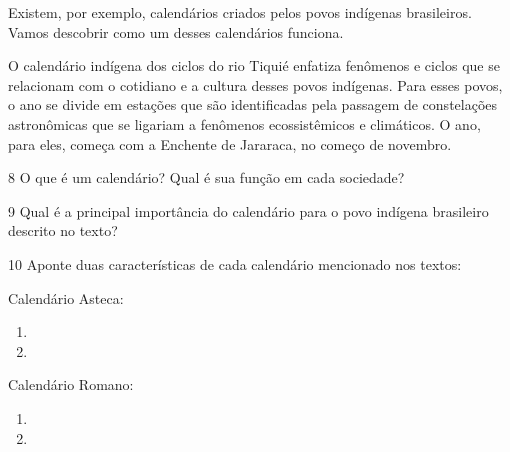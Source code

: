 Existem, por exemplo, calendários criados pelos povos indígenas brasileiros. Vamos descobrir como um desses calendários funciona.

O calendário indígena dos ciclos do rio Tiquié enfatiza fenômenos e ciclos que se relacionam com o cotidiano e a cultura desses povos indígenas. Para esses povos, o ano se divide em estações que são identificadas pela passagem de constelações astronômicas que se ligariam a fenômenos ecossistêmicos e climáticos. O ano, para eles, começa com a Enchente de Jararaca, no começo de novembro.


\num{8} O que é um calendário? Qual é sua função em cada sociedade?


\num{9} Qual é a principal importância do calendário para o povo indígena brasileiro descrito no texto?


\num{10} Aponte duas características de cada calendário mencionado nos textos:

Calendário Asteca:

\begin{enumerate}
\item {}

\item {}
\end{enumerate}

Calendário Romano:

\begin{enumerate}
\item {}

\item {}
\end{enumerate}

